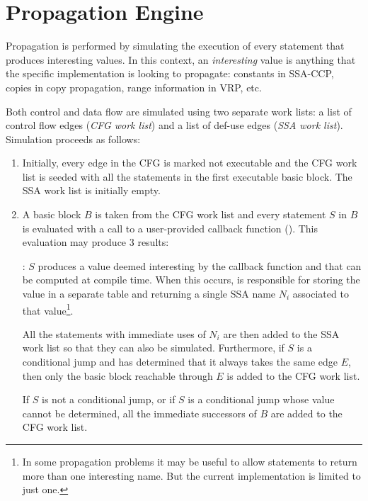 \section{Propagation Engine}
\label{novillo:sec:prop-engine}

Propagation is performed by simulating the execution of every
statement that produces interesting values.  In this context, an
\textit{interesting} value is anything that the specific
implementation is looking to propagate: constants in SSA-CCP,
copies in copy propagation, range information in VRP, etc.

Both control and data flow are simulated using two separate work
lists: a list of control flow edges (\textit{CFG work list}) and a
list of def-use edges (\textit{SSA work list}).  Simulation proceeds as
follows:

\begin{enumerate}
\item	Initially, every edge in the CFG is marked not executable
	and the CFG work list is seeded with all the statements in
	the first executable basic block.  The SSA work list is
	initially empty.

\item	\label{novillo:prop-return-value}A basic block $B$ is
	taken from the CFG work list and every statement $S$ in
	$B$ is evaluated with a call to a user-provided callback
	function ().  This evaluation
	may produce 3 results:

	: $S$ produces a
	value deemed interesting by the callback function and
	that can be computed at compile time.  When this occurs,
	 is responsible for
	storing the value in a separate table and returning a
	single SSA name $N_i$ associated to that
	value\footnote{In some propagation problems it may be
	useful to allow statements to return more than one
	interesting name.  But the current implementation is
	limited to just one.}.

	All the statements with immediate uses of $N_i$ are then
	added to the SSA work list so that they can also be
	simulated.  Furthermore, if $S$ is a conditional jump and
	 has determined that it
	always takes the same edge $E$, then only the basic block
	reachable through $E$ is added to the CFG work list.

	If $S$ is not a conditional jump, or if $S$ is a
	conditional jump whose value cannot be determined, all
	the immediate successors of $B$ are added to the CFG
	work list.


\end{enumerate}
